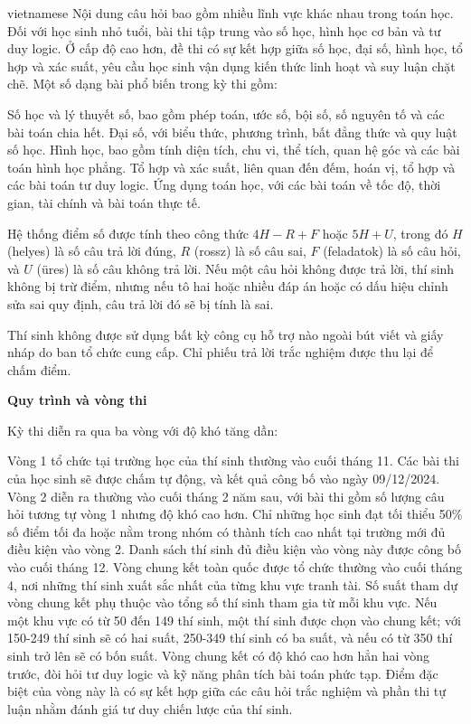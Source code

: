 \documentclass{article}
\begin{document}
\begin{otherlanguage*}{vietnamese}
Nội dung câu hỏi bao gồm nhiều lĩnh vực khác nhau trong toán học. Đối với học sinh nhỏ tuổi, bài thi tập trung vào số học, hình học cơ bản và tư duy logic.
Ở cấp độ cao hơn, đề thi có sự kết hợp giữa số học, đại số, hình học, tổ hợp và xác suất, yêu cầu học sinh vận dụng kiến thức linh hoạt và suy luận chặt chẽ.
Một số dạng bài phổ biến trong kỳ thi gồm:
\begin{itemize}[topsep=0pt, partopsep=0pt, itemsep=0pt]
    \ii Số học và lý thuyết số, bao gồm phép toán, ước số, bội số, số nguyên tố và các bài toán chia hết.
    \ii Đại số, với biểu thức, phương trình, bất đẳng thức và quy luật số học.
    \ii Hình học, bao gồm tính diện tích, chu vi, thể tích, quan hệ góc và các bài toán hình học phẳng.
    \ii Tổ hợp và xác suất, liên quan đến đếm, hoán vị, tổ hợp và các bài toán tư duy logic.
    \ii Ứng dụng toán học, với các bài toán về tốc độ, thời gian, tài chính và bài toán thực tế.
\end{itemize}

Hệ thống điểm số được tính theo công thức $4H - R + F$ hoặc $5H + U$, trong đó $H$ (helyes) là số câu trả lời đúng, $R$ (rossz) là số câu sai, $F$ (feladatok) là số câu hỏi,
và $U$ (üres) là số câu không trả lời. Nếu một câu hỏi không được trả lời, thí sinh không bị trừ điểm, nhưng nếu tô hai hoặc nhiều đáp án hoặc có dấu hiệu chỉnh sửa sai quy định,
câu trả lời đó sẽ bị tính là sai.

Thí sinh không được sử dụng bất kỳ công cụ hỗ trợ nào ngoài bút viết và giấy nháp do ban tổ chức cung cấp. Chỉ phiếu trả lời trắc nghiệm được thu lại để chấm điểm.

\textbf{Quy trình và vòng thi}

Kỳ thi diễn ra qua ba vòng với độ khó tăng dần:
\begin{enumerate}[topsep=0pt, partopsep=0pt, itemsep=0pt]
    \ii Vòng 1 tổ chức tại trường học của thí sinh thường vào cuối tháng 11. Các bài thi của học sinh sẽ được chấm tự động, và kết quả công bố vào ngày 09/12/2024.
    \ii Vòng 2 diễn ra thường vào cuối tháng 2 năm sau, với bài thi gồm số lượng câu hỏi tương tự vòng 1 nhưng độ khó cao hơn.
    Chỉ những học sinh đạt tối thiểu 50\% số điểm tối đa hoặc nằm trong nhóm có thành tích cao nhất tại trường mới đủ điều kiện vào vòng 2.
    Danh sách thí sinh đủ điều kiện vào vòng này được công bố vào cuối tháng 12.
    \ii Vòng chung kết toàn quốc được tổ chức thường vào cuối tháng 4, nơi những thí sinh xuất sắc nhất của từng khu vực tranh tài.
    Số suất tham dự vòng chung kết phụ thuộc vào tổng số thí sinh tham gia từ mỗi khu vực.
    Nếu một khu vực có từ 50 đến 149 thí sinh, một thí sinh được chọn vào chung kết; với 150-249 thí sinh sẽ có hai suất, 250-349 thí sinh có ba suất,
    và nếu có từ 350 thí sinh trở lên sẽ có bốn suất.
    Vòng chung kết có độ khó cao hơn hẳn hai vòng trước, đòi hỏi tư duy logic và kỹ năng phân tích bài toán phức tạp.
    Điểm đặc biệt của vòng này là có sự kết hợp giữa các câu hỏi trắc nghiệm và phần thi tự luận nhằm đánh giá tư duy chiến lược của thí sinh.
\end{enumerate}


\end{otherlanguage*}
\end{document}

